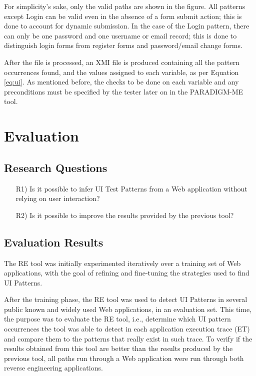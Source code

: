\documentclass[conference]{IEEEtran}
\begin{document}
For simplicity's sake, only the valid paths are shown in the figure. All patterns except Login can be valid even in the absence of a form submit action; this is done to account for dynamic submission. In the case of the Login pattern, there can only be one password and one username or email record; this is done to distinguish login forms from register forms and password/email change forms.

After the file is processed, an XMI file is produced containing all the pattern occurrences found, and the values assigned to each variable, as per Equation \ref{eq:ui}. As mentioned before, the checks to be done on each variable and any preconditions must be specified by the tester later on in the PARADIGM-ME tool.

\section{Evaluation}\label{sec:eval}

\subsection{Research Questions}
\begin{itemize}
  \item[R1)] Is it possible to infer UI Test Patterns from a Web application without relying on user interaction?\\
  \item[R2)] Is it possible to improve the results provided by the previous tool?\\
\end{itemize}
\subsection{Evaluation Results}

The RE tool was initially experimented iteratively over a training set of Web applications, with the goal of refining and fine-tuning the strategies used to find UI Patterns.

After the training phase, the RE tool was used to detect UI Patterns in several public known and widely used Web applications, in an evaluation set. This time, the purpose was to evaluate the RE tool, i.e., determine which UI pattern occurrences the tool was able to detect in each application execution trace (ET) and compare them to the patterns that really exist in such trace. To verify if the results obtained from this tool are better than the results produced by the previous tool, all paths run through a Web application were run through both reverse engineering applications.
\end{document}
